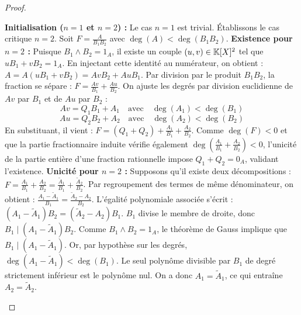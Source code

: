 \documentclass[12pt, a4paper]{report}
\begin{document}
\begin{proof}
    \begin{outline}
        \1 \textbf{Initialisation ($n=1$ et $n=2$) :}
            \2 Le cas $n=1$ est trivial. Établissons le cas critique $n=2$. Soit $F = \frac{A}{B_1 B_2}$ avec $\deg(A) < \deg(B_1 B_2)$.
            \2 \textbf{Existence pour $n=2$ :}
                \3 Puisque $B_1 \wedge B_2 = 1_A$, il existe un couple $(u,v) \in \mathbb{K}[X]^2$ tel que $u B_1 + v B_2 = 1_A$.
                \3 En injectant cette identité au numérateur, on obtient : $A = A(u B_1 + v B_2) = A v B_2 + A u B_1$.
                \3 Par division par le produit $B_1 B_2$, la fraction se sépare : $F = \frac{Av}{B_1} + \frac{Au}{B_2}$.
                \3 On ajuste les degrés par division euclidienne de $Av$ par $B_1$ et de $Au$ par $B_2$ :
                   \[ Av = Q_1 B_1 + A_1 \quad \text{avec} \quad \deg(A_1) < \deg(B_1) \]
                   \[ Au = Q_2 B_2 + A_2 \quad \text{avec} \quad \deg(A_2) < \deg(B_2) \]
                \3 En substituant, il vient : $F = (Q_1 + Q_2) + \frac{A_1}{B_1} + \frac{A_2}{B_2}$.
                \3 Comme $\deg(F) < 0$ et que la partie fractionnaire induite vérifie également $\deg\left(\frac{A_1}{B_1} + \frac{A_2}{B_2}\right) < 0$, l'unicité de la partie entière d'une fraction rationnelle impose $Q_1 + Q_2 = 0_A$, validant l'existence.
            \2 \textbf{Unicité pour $n=2$ :}
                \3 Supposons qu'il existe deux décompositions : $F = \frac{A_1}{B_1} + \frac{A_2}{B_2} = \frac{\tilde{A}_1}{B_1} + \frac{\tilde{A}_2}{B_2}$.
                \3 Par regroupement des termes de même dénominateur, on obtient : $\frac{A_1 - \tilde{A}_1}{B_1} = \frac{\tilde{A}_2 - A_2}{B_2}$.
                \3 L'égalité polynomiale associée s'écrit : $(A_1 - \tilde{A}_1)B_2 = (\tilde{A}_2 - A_2)B_1$.
                \3 $B_1$ divise le membre de droite, donc $B_1 \mid (A_1 - \tilde{A}_1)B_2$. Comme $B_1 \wedge B_2 = 1_A$, le théorème de Gauss implique que $B_1 \mid (A_1 - \tilde{A}_1)$.
                \3 Or, par hypothèse sur les degrés, $\deg(A_1 - \tilde{A}_1) < \deg(B_1)$. Le seul polynôme divisible par $B_1$ de degré strictement inférieur est le polynôme nul. On a donc $A_1 = \tilde{A}_1$, ce qui entraîne $A_2 = \tilde{A}_2$.
        

\end{outline}
\end{proof}
\end{document}
